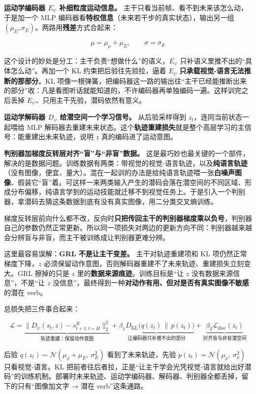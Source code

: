 \documentclass[
  chinese,
]{ctexart}
\begin{document}
\textbf{运动学编码器 \(E_\psi\) 补细粒度运动信息。}
主干只看当前帧、看不到未来该怎么动，于是加一个 MLP
编码器看\textbf{特权信息}（未来若干步的真实状态），输出另一组
\((\mu_E, \sigma_E)\)。两路用\textbf{残差}方式合起来：

\[\mu = \mu_\rho + \mu_E, \qquad \sigma = \sigma_E\]

这个设计的妙处是分工：主干负责``想做什么''的语义，\(E_\psi\)
只补语义里推不出的``具体怎么动''。再加一个 KL 约束把后验往先验拉，逼着
\(E_\psi\) \textbf{只承载视觉-语言无法推断的那部分}。KL
项像一根弹簧，把编码器这一路的输出往``主干已经能推断出来的部分''收：凡是看图听话就能知道的，不许编码器再单独编码一遍。这样训完之后丢掉
\(E_\psi\)、只用主干先验，潜码依然有意义。

\textbf{运动学解码器 \(D_\psi\) 给潜空间一个学习信号。} 从后验采样得到
\(z_t\)，连同当前状态一起喂给 MLP
解码器去重建未来状态。这个\textbf{轨迹重建损失}就是整个高层学习的主信号：能重建出未来轨迹，说明
\(z\) 真的编码进了运动意图。

\textbf{判别器加梯度反转层对齐``盲''与``非盲''数据。}
这是最巧妙也最关键的一个部件，解决的是数据问题。训练数据有两类：带视觉的视觉-语言轨迹，以及\textbf{纯语言轨迹}（没有图像，便宜、量大）。混在一起训的办法是给纯语言轨迹喂一张\textbf{白噪声图像}、假装它``盲''着。可这样一来两类输入产生的潜码会落在潜空间的不同区域、形成分布偏移，纯语言学到的运动技能就迁移不到视觉任务上。于是引入一个判别器，拿潜码去猜这条数据到底有没有真实图像，用二分类交叉熵训练。

梯度反转层前向什么都不改，反向时\textbf{只把传回主干的判别器梯度乘以负号}，判别器自己的参数仍然正常更新。所以同一项损失对两边的更新方向不同：判别器越来越会分辨盲与非盲，而主干被训练成让判别器更难分辨。

这里最容易误解：\textbf{GRL 不是让主干变差。} 主干对轨迹重建项和 KL
项仍然正常梯度下降，\(z\)
必须保留动作意图，否则解码器重建不了未来轨迹、重建损失立刻变大。GRL
擦掉的只是 \(z\) 里的\textbf{数据来源痕迹}。训练目标是``让 \(z\)
没有数据来源信息''，不是``让 \(z\)
没信息''，最终得到一种\textbf{对动作有用、但对是否有真实图像不敏感}的潜在
verb。

总损失把三件事合起来：

\[\mathcal{L} = \underbrace{\big\| D_\psi(s_t, z) - s^R_{t+1:t+H} \big\|_2^2}_{\text{轨迹重建：保留动作意图}} + \underbrace{\beta_1 D_\text{KL}\big(q(z_t)\,\|\,p(z_t)\big)}_{\text{让编码器只补推不出的部分}} + \underbrace{\beta_2 \mathcal{L}_\text{disc}(z_t)}_{\text{对齐盲与非盲潜空间}}\]

后验 \(q(z_t)=\mathcal{N}(\mu_\rho+\mu_E,\ \sigma_E^2)\)
看到了未来轨迹，先验 \(p(z_t)=\mathcal{N}(\mu_\rho,\ \sigma_\rho^2)\)
只看视觉-语言。KL
把前者往后者拉，正是``让主干学会光凭视觉-语言就给出好潜码''的训练机制。部署时未来轨迹、运动学编码器、解码器、判别器全都丢掉，留下的只有``图像加文字
→ 潜在 verb''这条通路。
\end{document}
